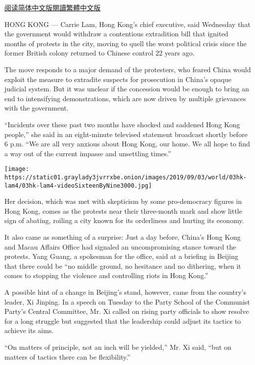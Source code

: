 \href{https://cn.nytimes3xbfgragh.onion/china/20190904/hong-kong-carrie-lam-extradition-bill/}{阅读简体中文版}\href{https://cn.nytimes3xbfgragh.onion/china/20190904/hong-kong-carrie-lam-extradition-bill/zh-hant/}{閱讀繁體中文版}

HONG KONG --- Carrie Lam, Hong Kong's chief executive, said Wednesday
that the government would withdraw a contentious extradition bill that
ignited months of protests in the city, moving to quell the worst
political crisis since the former British colony returned to Chinese
control 22 years ago.

The move responds to a major demand of the protesters, who feared China
would exploit the measure to extradite suspects for prosecution in
China's opaque judicial system. But it was unclear if the concession
would be enough to bring an end to intensifying demonstrations, which
are now driven by multiple grievances with the government.

``Incidents over these past two months have shocked and saddened Hong
Kong people,'' she said in an eight-minute televised statement broadcast
shortly before 6 p.m. ``We are all very anxious about Hong Kong, our
home. We all hope to find a way out of the current impasse and
unsettling times.''

\texttt{[image: https://static01.graylady3jvrrxbe.onion/images/2019/09/03/world/03hk-lam4/03hk-lam4-videoSixteenByNine3000.jpg]}

Her decision, which was met with skepticism by some pro-democracy
figures in Hong Kong, comes as the protests near their three-month mark
and show little sign of abating, roiling a city known for its
orderliness and hurting its economy.

It also came as something of a surprise: Just a day before, China's Hong
Kong and Macau Affairs Office had signaled an uncompromising stance
toward the protests. Yang Guang, a spokesman for the office, said at a
briefing in Beijing that there could be ``no middle ground, no hesitance
and no dithering, when it comes to stopping the violence and controlling
riots in Hong Kong.''

A possible hint of a change in Beijing's stand, however, came from the
country's leader, Xi Jinping. In a speech on Tuesday to the Party School
of the Communist Party's Central Committee, Mr. Xi called on rising
party officials to show resolve for a long struggle but suggested that
the leadership could adjust its tactics to achieve its aims.

``On matters of principle, not an inch will be yielded,'' Mr. Xi said,
``but on matters of tactics there can be flexibility.''

